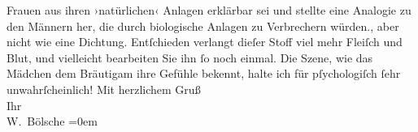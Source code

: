 \begin{ledgroupsized}[t]{13cm}
{{{                  Frauen aus ihren ›natürlichen‹ Anlagen erklärbar sei und stellte eine Analogie zu
                  den Männern her, die durch biologische Anlagen zu Verbrechern würden.}}}\label{K_L00221-1h}, aber
               nicht wie eine Dichtung. Entſchieden verlangt dieſer Stoff viel mehr Fleiſch und
               Blut, und vielleicht bearbeiten Sie ihn ſo noch einmal. Die Szene, {\pb}wie
               das Mädchen dem Bräutigam ihre Gefühle bekennt, halte ich für pſychologiſch ſehr
               unwahrſcheinlich!\pend
           \pstart
           Mit herzlichem Gruß{\\[\baselineskip]} Ihr{\\[\baselineskip]}\spacefill\mbox{W. Bölsche}\pend
           \leftskip=0em{}
         
         \endnumbering{}\end{ledgroupsized}  \newcommand{\dateiname}{L00221}\newcommand{\titel}{Wilhelm Bölsche an Arthur Schnitzler, 12. 6. 1893}\newcommand{\editorInnen}{Martin Anton Müller und Gerd-Hermann Susen}
      